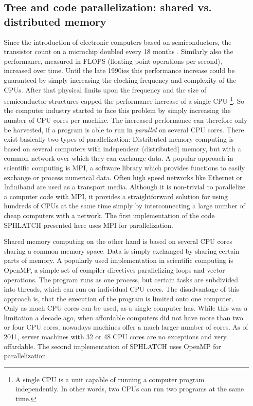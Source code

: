 \subsection{Tree and code parallelization: shared vs. distributed memory}
Since the introduction of electronic computers based on semiconductors, the transistor count on a microchip doubled every 18 months \citep{Moore:1965p4006}. Similarly also the performance, measured in FLOPS (floating point operations per second), increased over time. Until the late 1990ies this performance increase could be guaranteed by simply increasing the clocking frequency and complexity of the CPUs. After that physical limits upon the frequency and the size of semiconductor structures capped the performance increase of a single CPU \footnote{A single CPU is a unit capable of running a computer program independently. In other words, two CPUs can run two programs at the same time.}. So the computer industry started to face this problem by simply increasing the number of CPU cores per machine. The increased performance can therefore only be harvested, if a program is able to run in \emph{parallel} on several CPU cores. There exist basically two types of parallelization: 
Distributed memory computing is based on several computers with independent (distributed) memory, but with a common network over which they can exchange data. A popular approach in scientific computing is MPI, a software library which provides functions to easily exchange or process numerical data. Often high speed networks like Ethernet or Infiniband are used as a transport media. Although it is non-trivial to parallelize a computer code with MPI, it provides a straightforward solution for using hundreds of CPUs at the same time simply by interconnecting a large number of cheap computers with a network. The first implementation of the code SPHLATCH presented here uses MPI for parallelization. 

Shared memory computing on the other hand is based on several CPU cores sharing a common memory space. Data is simply exchanged by sharing certain parts of memory. A popularly used implementation in scientific computing is OpenMP, a simple set of compiler directives parallelizing loops and vector operations. The program runs as one process, but certain tasks are subdivided into threads, which can run on individual CPU cores. The disadvantage of this approach is, that the execution of the program is limited onto one computer. Only as much CPU cores can be used, as a single computer has. While this was a limitation a decade ago, when affordable computers did not have more than two or four CPU cores, nowadays machines offer a much larger number of cores. As of 2011, server machines with 32 or 48 CPU cores are no exceptions and very offardable. The second implementation of SPHLATCH uses OpenMP for parallelization.

